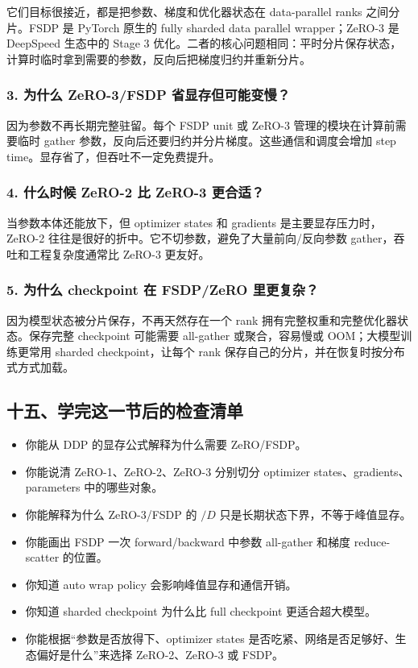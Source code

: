 它们目标很接近，都是把参数、梯度和优化器状态在 data-parallel ranks 之间分片。FSDP 是 PyTorch 原生的 fully sharded data parallel wrapper；ZeRO-3 是 DeepSpeed 生态中的 Stage 3 优化。二者的核心问题相同：平时分片保存状态，计算时临时拿到需要的参数，反向后把梯度归约并重新分片。

\subsubsection*{3. 为什么 ZeRO-3/FSDP 省显存但可能变慢？}

因为参数不再长期完整驻留。每个 FSDP unit 或 ZeRO-3 管理的模块在计算前需要临时 gather 参数，反向后还要归约并分片梯度。这些通信和调度会增加 step time。显存省了，但吞吐不一定免费提升。

\subsubsection*{4. 什么时候 ZeRO-2 比 ZeRO-3 更合适？}

当参数本体还能放下，但 optimizer states 和 gradients 是主要显存压力时，ZeRO-2 往往是很好的折中。它不切参数，避免了大量前向/反向参数 gather，吞吐和工程复杂度通常比 ZeRO-3 更友好。

\subsubsection*{5. 为什么 checkpoint 在 FSDP/ZeRO 里更复杂？}

因为模型状态被分片保存，不再天然存在一个 rank 拥有完整权重和完整优化器状态。保存完整 checkpoint 可能需要 all-gather 或聚合，容易慢或 OOM；大模型训练更常用 sharded checkpoint，让每个 rank 保存自己的分片，并在恢复时按分布式方式加载。

\subsection{十五、学完这一节后的检查清单}

\begin{itemize}[leftmargin=1.5em]
  \item 你能从 DDP 的显存公式解释为什么需要 ZeRO/FSDP。
  \item 你能说清 ZeRO-1、ZeRO-2、ZeRO-3 分别切分 optimizer states、gradients、parameters 中的哪些对象。
  \item 你能解释为什么 ZeRO-3/FSDP 的 $/D$ 只是长期状态下界，不等于峰值显存。
  \item 你能画出 FSDP 一次 forward/backward 中参数 all-gather 和梯度 reduce-scatter 的位置。
  \item 你知道 auto wrap policy 会影响峰值显存和通信开销。
  \item 你知道 sharded checkpoint 为什么比 full checkpoint 更适合超大模型。
  \item 你能根据“参数是否放得下、optimizer states 是否吃紧、网络是否足够好、生态偏好是什么”来选择 ZeRO-2、ZeRO-3 或 FSDP。
\end{itemize}

